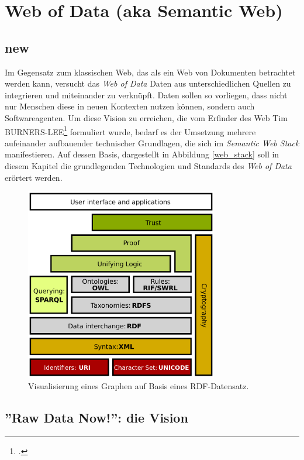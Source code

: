 \documentclass[12pt,a4paper]{article}
\begin{document}
\section{Web of Data (aka Semantic Web)}

\subsection{new}

Im Gegensatz zum klassischen Web, das als ein Web von Dokumenten betrachtet werden kann, versucht das \textit{Web of Data} Daten aus unterschiedlichen Quellen zu integrieren und miteinander zu verknüpft. Daten sollen so vorliegen, dass nicht nur Menschen diese in neuen Kontexten nutzen können, sondern auch Softwareagenten. Um diese Vision zu erreichen, die vom Erfinder des Web Tim BURNERS-LEE\footcite[Vgl.][]{berners2001semantic} formuliert wurde, bedarf es der Umsetzung mehrere aufeinander aufbauender technischer Grundlagen, die sich im \textit{Semantic Web Stack} manifestieren. Auf dessen Basis, dargestellt in Abbildung \ref{web_stack} soll in diesem Kapitel die grundlegenden Technologien und Standards des \textit{Web of Data} erörtert werden.
\begin{figure}[h]
  \centering
	\includegraphics[width=0.75\textwidth]{img/web_stack.png}  
    \caption[Visualisierung eines Graphen auf Basis eines RDF-Datensatz, \protect\url{https://www.w3.org/TR/rdf11-primer/}, 10.04.2019.]{Visualisierung eines Graphen auf Basis eines RDF-Datensatz.}
  	\label{fig:web_stack}
\end{figure}

\subsection{''Raw Data Now!'': die Vision}
\end{document}
